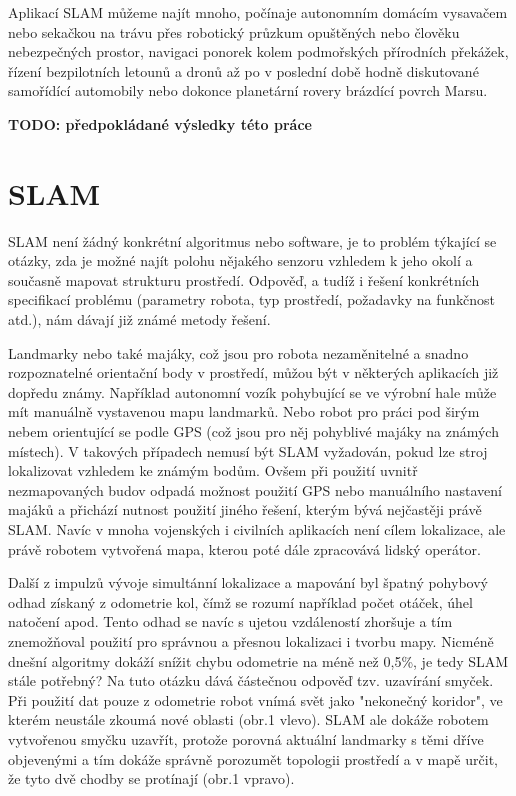 \documentclass[12pt,a4paper]{article}
\begin{document}
Aplikací SLAM můžeme najít mnoho, počínaje autonomním domácím vysavačem nebo sekačkou na trávu přes robotický průzkum opuštěných nebo člověku nebezpečných prostor, navigaci ponorek kolem podmořských přírodních překážek, řízení bezpilotních letounů a dronů až po v poslední době hodně diskutované samořídící automobily nebo dokonce planetární rovery brázdící povrch Marsu.

\textbf{TODO: předpokládané výsledky této práce}


\newpage
\section{SLAM}
SLAM není žádný konkrétní algoritmus nebo software, je to problém týkající se otázky, zda je možné najít polohu nějakého senzoru vzhledem k jeho okolí a současně mapovat strukturu prostředí. Odpověď, a tudíž i řešení konkrétních specifikací problému (parametry robota, typ prostředí, požadavky na funkčnost atd.), nám dávají již známé metody řešení.

Landmarky nebo také majáky, což jsou pro robota nezaměnitelné a snadno rozpoznatelné orientační body v prostředí, můžou být v některých aplikacích již dopředu známy. Například autonomní vozík pohybující se ve výrobní hale může mít manuálně vystavenou mapu landmarků. Nebo robot pro práci pod širým nebem orientující se podle GPS (což jsou pro něj pohyblivé majáky na známých místech). V takových případech nemusí být SLAM vyžadován, pokud lze stroj lokalizovat vzhledem ke známým bodům. Ovšem při použití uvnitř nezmapovaných budov odpadá možnost použití GPS nebo manuálního nastavení majáků a přichází nutnost použití jiného řešení, kterým bývá nejčastěji právě SLAM. Navíc v mnoha vojenských i civilních aplikacích není cílem lokalizace, ale právě robotem vytvořená mapa, kterou poté dále zpracovává lidský operátor.

Další z impulzů vývoje simultánní lokalizace a mapování byl špatný pohybový odhad získaný z odometrie kol, čímž se rozumí například počet otáček, úhel natočení apod. Tento odhad se navíc s ujetou vzdáleností zhoršuje a tím znemožňoval použití pro správnou a přesnou lokalizaci i tvorbu mapy. Nicméně dnešní algoritmy dokáží snížit chybu odometrie na méně než 0,5\%, je tedy SLAM stále potřebný? Na tuto otázku dává částečnou odpověď tzv. uzavírání smyček. Při použití dat pouze z odometrie robot vnímá svět jako "nekonečný koridor", ve kterém neustále zkoumá nové oblasti (obr.1 vlevo). SLAM ale dokáže robotem vytvořenou smyčku uzavřít, protože porovná aktuální landmarky s těmi dříve objevenými a tím dokáže správně porozumět topologii prostředí a v mapě určit, že tyto dvě chodby se protínají (obr.1 vpravo).
\end{document}
